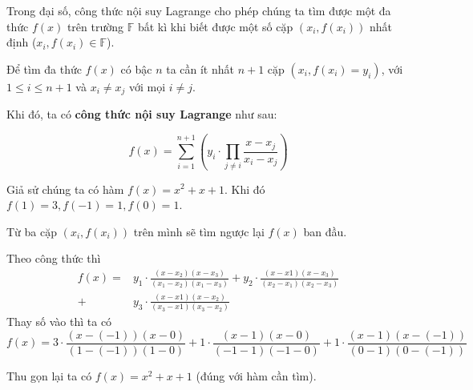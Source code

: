 \documentclass{mynotes}
\newcommand{\FF}{\mathbb{F}}
\begin{document}
Trong đại số, công thức nội suy Lagrange cho phép chúng ta tìm được một đa thức $f(x)$ trên trường $\FF$ bất kì khi biết được một số cặp $(x_i, f(x_i))$ nhất định ($x_i, f(x_i) \in \FF$).

Để tìm đa thức $f(x)$ có bậc $n$ ta cần ít nhất $n+1$ cặp $(x_i, f(x_i) = y_i)$, với $1 \leqslant i \leqslant n+1$ và $x_i \neq x_j$ với mọi $i \neq j$.

Khi đó, ta có \textbf{công thức nội suy Lagrange} như sau:

\begin{equation*}
    \displaystyle{f(x) = \sum_{i=1}^{n+1} \left(y_i \cdot \prod_{j \neq i} \frac{x - x_j}{x_i - x_j}\right)}
\end{equation*}

\begin{example}
    Giả sử chúng ta có hàm $f(x) = x^2 + x + 1$. Khi đó $f(1) = 3, f(-1) = 1, f(0) = 1$.

    Từ ba cặp $(x_i, f(x_i))$ trên mình sẽ tìm ngược lại $f(x)$ ban đầu.

    Theo công thức thì
    \begin{align*}
        f(x) = & y_1 \cdot \frac{(x - x_2) (x - x_3)}{(x_1 - x_2) (x_1 - x_3)} + y_2 \cdot \frac{(x - x1) (x - x_3)}{(x_2 - x_1) (x_2 - x_3)} \\
        + & y_3 \cdot \frac{(x - x1) (x - x_2)}{(x_3 - x1) (x_3 - x_2)}
    \end{align*}
    Thay số vào thì ta có
    \begin{equation*}
        \displaystyle{f(x) = 3 \cdot \frac{(x - (-1)) (x - 0)}{(1 - (-1)) (1 - 0)} + 1 \cdot \frac{(x - 1) (x - 0)}{(-1 - 1) (-1 - 0)} + 1 \cdot \frac{(x - 1) (x - (-1))}{(0 - 1) (0 - (-1))}}
    \end{equation*}

    Thu gọn lại ta có $f(x) = x^2 + x + 1$ (đúng với hàm cần tìm).
\end{example}
\end{document}
